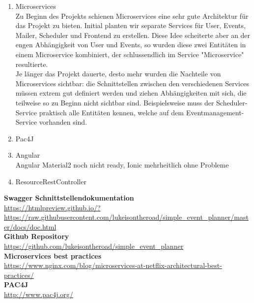 \documentclass[11pt]{article} %
\begin{document}
\begin{enumerate}
\item Microservices\\
Zu Beginn des Projekts schienen Microservices eine sehr gute Architektur für das Projekt zu bieten. Initial planten wir separate Services für User, Events, Mailer, Scheduler und Frontend zu erstellen. Diese Idee scheiterte aber an der engen Abhängigkeit von User und Events, so wurden diese zwei Entitäten in einem Microservice kombiniert, der schlussendlich im Service "Microservice" resultierte.
\\
Je länger das Projekt dauerte, desto mehr wurden die Nachteile von Microservices sichtbar: die Schnittstellen zwischen den verschiedenen Services müssen extrem gut definiert werden und ziehen Abhängigkeiten mit sich, die teilweise so zu Beginn nicht sichtbar sind. Beispielsweise muss der Scheduler-Service praktisch alle Entitäten kennen, welche auf dem Eventmanagement-Service vorhanden sind.
\\

\item Pac4J\\
\item Angular\\
Angular Material2 noch nicht ready, Ionic mehrheitlich ohne Probleme
\item ResourceRestController
\end{enumerate}

\newpage
\begin{appendices}

\textbf{Swagger Schnittstellendokumentation}\\
\url{https://htmlpreview.github.io/?https://raw.githubusercontent.com/lukeisontheroad/simple_event_planner/master/docs/doc.html}\\

\textbf{Github Repository}\\
\url{https://github.com/lukeisontheroad/simple_event_planner}\\

\textbf{Microservices best practices}\\
\url{https://www.nginx.com/blog/microservices-at-netflix-architectural-best-practices/}\\

\textbf{PAC4J}\\
\url{http://www.pac4j.org/}\\



\newpage

\end{appendices}
\end{document}
